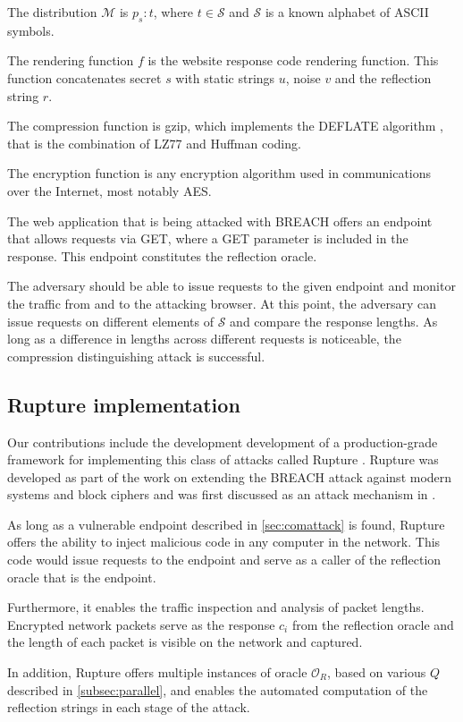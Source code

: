 \documentclass{sig-alternate-05-2015}
\begin{document}
The distribution $\mathcal{M}$ is ${p_s:t}$, where $t \in \mathcal{S}$ and
$\mathcal{S}$ is a known alphabet of ASCII symbols.

The rendering function $f$ is the website response code rendering function. This
function concatenates secret $s$ with static strings $u$, noise $v$ and the
reflection string $r$.

The compression function is gzip, which implements the DEFLATE algorithm
\cite{c12}, that is the combination of LZ77 and Huffman coding.

The encryption function is any encryption algorithm used in communications over
the Internet, most notably AES.

The web application that is being attacked with BREACH offers an endpoint that
allows requests via GET, where a GET parameter is included in the response. This
endpoint constitutes the reflection oracle.

The adversary should be able to issue requests to the given endpoint and monitor
the traffic from and to the attacking browser. At this point, the adversary can
issue requests on different elements of $\mathcal{S}$ and compare the response lengths. As
long as a difference in lengths across different requests is noticeable, the
compression distinguishing attack is successful.

\subsection{Rupture implementation}\label{subsec:rupture}
Our contributions include the development development of a production-grade
framework for implementing this class of attacks called Rupture \cite{c13}.
Rupture was developed as part of the work on extending the BREACH attack against
modern systems and block ciphers and was first discussed as an attack mechanism
in \cite{c7}.

As long as a vulnerable endpoint described in \ref{sec:comattack} is found,
Rupture offers the ability to inject malicious code in any computer in the
network. This code would issue requests to the endpoint and serve as a caller of
the reflection oracle that is the endpoint.

Furthermore, it enables the traffic inspection and analysis of packet
lengths. Encrypted network packets serve as the response $c_i$ from the
reflection oracle and the length of each packet is visible on the network and
captured.

In addition, Rupture offers multiple instances of oracle $\mathcal{O}_R$, based
on various $Q$ described in \ref{subsec:parallel}, and enables the automated
computation of the reflection strings in each stage of the attack.
\end{document}
